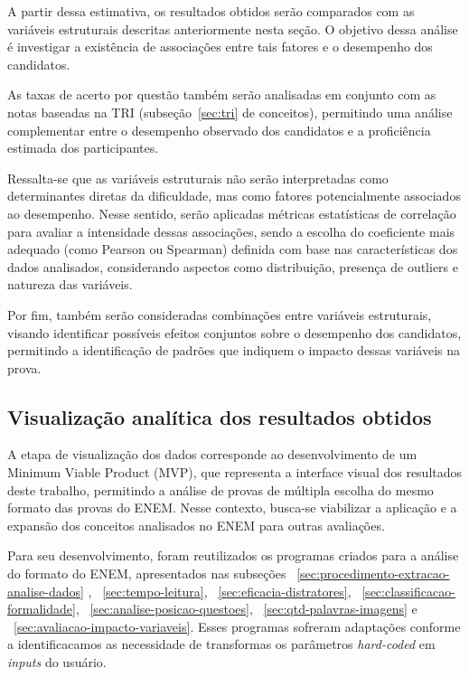 \documentclass[a4paper,10pt, twocolumn]{article}
\begin{document}

A partir dessa estimativa, os resultados obtidos serão comparados com as variáveis estruturais descritas anteriormente nesta seção. O objetivo dessa análise é investigar a existência de associações entre tais fatores e o desempenho dos candidatos.

As taxas de acerto por questão também serão analisadas em conjunto com as notas baseadas na TRI (subseção~\ref{sec:tri} de conceitos), permitindo uma análise complementar entre o desempenho observado dos candidatos e a proficiência estimada dos participantes.

Ressalta-se que as variáveis estruturais não serão interpretadas como determinantes diretas da dificuldade, mas como fatores potencialmente associados ao desempenho. Nesse sentido, serão aplicadas métricas estatísticas de correlação para avaliar a intensidade dessas associações, sendo a escolha do coeficiente mais adequado (como Pearson ou Spearman) definida com base nas características dos dados analisados, considerando aspectos como distribuição, presença de outliers e natureza das variáveis.

Por fim, também serão consideradas combinações entre variáveis estruturais, visando identificar possíveis efeitos conjuntos sobre o desempenho dos candidatos, permitindo a identificação de padrões que indiquem o impacto dessas variáveis na prova.

\subsection{Visualização analítica dos resultados obtidos} 

A etapa de visualização dos dados corresponde ao desenvolvimento de um Minimum Viable Product (MVP), que representa a interface visual dos resultados deste trabalho, permitindo a análise de provas de múltipla escolha do mesmo formato das provas do ENEM. Nesse contexto, busca-se viabilizar a aplicação e a expansão dos conceitos analisados no ENEM para outras avaliações.

Para seu desenvolvimento, foram reutilizados os programas criados para a análise do formato do ENEM, apresentados nas subseções ~\ref{sec:procedimento-extracao-analise-dados} , ~\ref{sec:tempo-leitura}, ~\ref{sec:eficacia-distratores}, ~\ref{sec:classificacao-formalidade}, ~\ref{sec:analise-posicao-questoes}, ~\ref{sec:qtd-palavras-imagens} e ~\ref{sec:avaliacao-impacto-variaveis}.
Esses programas sofreram adaptações conforme a identificacamos as necessidade de transformas os parâmetros \textit{hard-coded} em \textit{inputs} do usuário.
\end{document}
